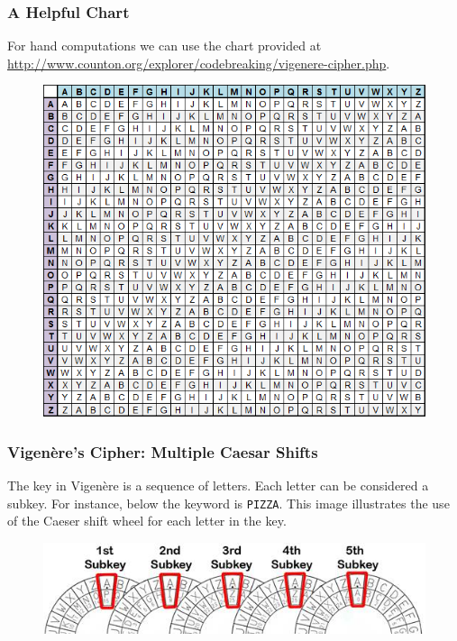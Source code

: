 \documentclass{beamer}
\newcommand{\<}{\langle}
\renewcommand{\>}{\rangle}
\begin{document}
\begin{frame}
\frametitle{A Helpful Chart}

For hand computations we can use the chart provided at \url{http://www.counton.org/explorer/codebreaking/vigenere-cipher.php}. 
\begin{figure}
\includegraphics[scale=.4]{IMG/vignere.png}
\end{figure}
\end{frame}



\begin{frame}[fragile]
\frametitle{Vigen\`{e}re's Cipher: Multiple Caesar Shifts}

The key in Vigen\`{e}re is a sequence of letters. Each letter can be considered a subkey. For instance, below the keyword is \verb|PIZZA|. This image illustrates the use of the Caeser shift wheel for each letter in the key. 

\begin{figure}
\includegraphics[scale=.8]{IMG/caesar.jpg}
\end{figure}
\end{frame}
\end{document}

